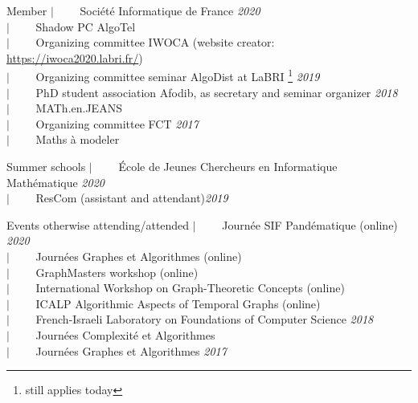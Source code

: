 \documentclass[french]{resume} %
\begin{document}
\begin{rSection}{Member} %
$| \qquad$ Société Informatique de France \hfill {\em 2020} \\
$| \qquad$ Shadow PC AlgoTel \\
$| \qquad$ Organizing committee IWOCA (website creator: \url{https://iwoca2020.labri.fr/}) \\
$| \qquad$ Organizing committee seminar AlgoDist at LaBRI \footnote[1]{\label{foot}still applies today} \hfill {\em 2019}\\
$| \qquad$ PhD student association Afodib, as secretary and seminar organizer \hfill {\em 2018}\\
$| \qquad$ MATh.en.JEANS \\
$| \qquad$ Organizing committee FCT \hfill {\em 2017}\\
$| \qquad$ Maths à modeler
\end{rSection}

\begin{rSection}{Summer schools}
$| \qquad$ École de Jeunes Chercheurs en Informatique Mathématique \hfill {\em 2020}\\
$| \qquad$ ResCom (assistant and attendant)\hfill {\em 2019}
\end{rSection}

\begin{rSection}{Events otherwise attending/attended}
$| \qquad$ Journée SIF Pandématique (online) \hfill {\em 2020}\\
$| \qquad$ Journées Graphes et Algorithmes (online) \\
$| \qquad$ GraphMasters workshop (online) \\
$| \qquad$ International Workshop on Graph-Theoretic Concepts (online) \\
$| \qquad$ ICALP Algorithmic Aspects of Temporal Graphs (online)\\
$| \qquad$ French-Israeli Laboratory on Foundations of Computer Science \hfill {\em 2018} \\
$| \qquad$ Journées Complexité et Algorithmes \\
$| \qquad$ Journées Graphes et Algorithmes \hfill {\em 2017} 
\end{rSection}


\end{document}
